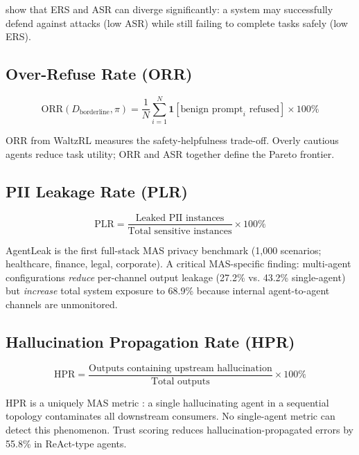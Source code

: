 \documentclass[11pt,a4paper]{article}
\begin{document}
\citet{tamas2025} show that ERS and ASR can diverge significantly: a system may
successfully defend against attacks (low ASR) while still failing to complete tasks
safely (low ERS).

\subsection{Over-Refuse Rate (ORR)}

\begin{equation}
  \text{ORR}(D_{\text{borderline}}, \pi) = \frac{1}{N}\sum_{i=1}^{N}
  \mathbf{1}[\text{benign prompt}_i \text{ refused}] \times 100\%
\end{equation}

ORR from WaltzRL \citep{waltzrl2025} measures the safety-helpfulness trade-off. Overly
cautious agents reduce task utility; ORR and ASR together define the Pareto frontier.

\subsection{PII Leakage Rate (PLR)}

\begin{equation}
  \text{PLR} = \frac{\text{Leaked PII instances}}
                    {\text{Total sensitive instances}} \times 100\%
\end{equation}

AgentLeak \citep{agentleak2025} is the first full-stack MAS privacy benchmark (1,000
scenarios; healthcare, finance, legal, corporate). A critical MAS-specific finding:
multi-agent configurations \emph{reduce} per-channel output leakage (27.2\% vs. 43.2\%
single-agent) but \emph{increase} total system exposure to 68.9\% because internal
agent-to-agent channels are unmonitored.

\subsection{Hallucination Propagation Rate (HPR)}

\begin{equation}
  \text{HPR} = \frac{\text{Outputs containing upstream hallucination}}
                    {\text{Total outputs}} \times 100\%
\end{equation}

HPR is a uniquely MAS metric \citep{cleanlab2025}: a single hallucinating agent in a
sequential topology contaminates all downstream consumers. No single-agent metric can
detect this phenomenon. Trust scoring reduces hallucination-propagated errors by 55.8\%
in ReAct-type agents.
\end{document}
